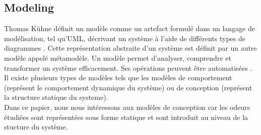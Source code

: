 


\subsection{Modeling}

Thomas Kühne définit un  modèle comme un artefact formulé dans un langage de
modélisation, tel qu'UML, décrivant un système à l'aide de différents types de
diagrammes \cite{kuhne2006matters}. Cette représentation abstraite d'un système
est définit par un autre modèle appelé métamodèle. Un modèle permet d'analyser,
comprendre et transformer un système efficacement.
Ses opérations peuvent être automatisées \cite{gonzalez2014formal}. Il existe
plusieurs types de modèles tels que les modèles de comportement (représent le
comportement dynamique du système) ou de conception (représent la structure
statique du systeme).\\ Dans ce papier, nous nous intéressons aux modèles de
conception car
les odeurs étudiées sont représentées sous forme statique et sont introduit au
niveau de la stucture du système.\\

